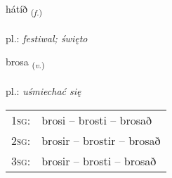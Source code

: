 \documentclass[frontgrid, backgrid]{flacards}\usepackage[]{graphicx}\usepackage[]{xcolor}
\begin{document}
\renewcommand{\flhead}{\vskip5pt \fboxsep=0pt {\small\bfseries\footnotesize Nafnorð | Noun}}
\renewcommand{\fcfoot}{\vskip5pt \fboxsep=0pt \hspace{2pt}{\small\bfseries\footnotesize 2K}}

\renewcommand{\blhead}{\vskip5pt {\small\bfseries\footnotesize Nafnorð | Noun }}
\renewcommand{\bcfoot}{\vskip5pt \hspace{2pt}{\small\bfseries\footnotesize 2K}}


{hátíð \small{\textsubscript{(\textit{f.})}} \\[1ex] %
\textphonetic{[hauːtʰið]} \\
pl.: \emph{festiwal; święto} \\  [2ex]
\renewcommand*{\arraystretch}{0.8}
}

\renewcommand{\flhead}{\vskip5pt \fboxsep=0pt {\small\bfseries\footnotesize Sagnorð | Verb}}
\renewcommand{\fcfoot}{\vskip5pt \fboxsep=0pt \hspace{2pt}{\small\bfseries\footnotesize 2K}}

\renewcommand{\blhead}{\vskip5pt {\small\bfseries\footnotesize Sagnorð | Verb }}
\renewcommand{\bcfoot}{\vskip5pt \hspace{2pt}{\small\bfseries\footnotesize 2K}}


{brosa \small{\textsubscript{(\textit{v.})}} \\[1ex] %
\textphonetic{[prɔːsa]} \\
pl.: \emph{uśmiechać się} \\  [2ex]
\renewcommand*{\arraystretch}{0.8}
\begin{tabular}{p{1cm}l}
\textsc{1sg}: & brosi -- brosti -- brosað \\ 
\textsc{2sg}: & brosir -- brostir -- brosað \\ 
\textsc{3sg}: & brosir -- brosti -- brosað \\ 
\end{tabular}
}
\end{document}
